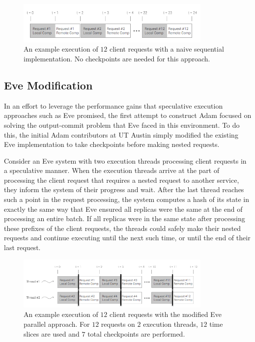 \documentclass[11pt, oneside]{report}
\begin{document}
\begin{figure}[h]
\centering
\includegraphics[width=0.85\textwidth]{NaiveSequential.png}
\caption{\label{NaiveSequential}An example execution of $12$ client requests with a naive sequential implementation. No checkpoints are needed for this approach.}
\end{figure}

\subsection{Eve Modification}\label{EveModification}

In an effort to leverage the performance gains that speculative execution approaches such as Eve promised, the first attempt to construct Adam focused on solving the output-commit problem that Eve faced in this environment. 
To do this, the initial Adam contributors at UT Austin simply modified the existing Eve implementation to take checkpoints before making nested requests. 

Consider an Eve system with two execution threads processing client requests in a speculative manner. 
When the execution threads arrive at the part of processing the client request that requires a nested request to another service, they inform the system of their progress and wait. 
After the last thread reaches such a point in the request processing, the system computes a hash of its state in exactly the same way that Eve ensured all replicas were the same at the end of processing an entire batch. 
If all replicas were in the same state after processing these prefixes of the client requests, the threads could safely make their nested requests and continue executing until the next such time, or until the end of their last request.

\begin{figure}[h]
\centering
\includegraphics[width=0.85\textwidth]{Parallel.png}
\caption{\label{parallel}An example execution of $12$ client requests with the modified Eve parallel approach. For $12$ requests on $2$ execution threads, $12$ time slices are used and $7$ total checkpoints are performed.}
\end{figure}
\end{document}
